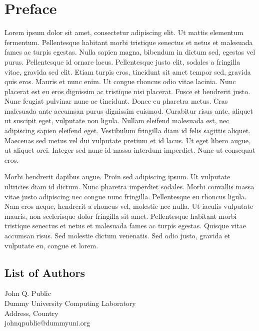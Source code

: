 \documentclass[a4paper,UKenglish]{oasicsmaster-v2016}
\begin{document}
\chapter{Preface} %

Lorem ipsum dolor sit amet, consectetur adipiscing elit. Ut mattis
elementum fermentum. Pellentesque habitant morbi tristique senectus et
netus et malesuada fames ac turpis egestas. Nulla sapien magna,
bibendum in dictum sed, egestas vel purus. Pellentesque id ornare
lacus. Pellentesque justo elit, sodales a fringilla vitae, gravida sed
elit. Etiam turpis eros, tincidunt sit amet tempor sed, gravida quis
eros. Mauris et nunc enim. Ut congue rhoncus odio vitae lacinia. Nunc
placerat est eu eros dignissim ac tristique nisi placerat. Fusce et
hendrerit justo. Nunc feugiat pulvinar nunc ac tincidunt. Donec eu
pharetra metus. Cras malesuada ante accumsan purus dignissim
euismod. Curabitur risus ante, aliquet ut suscipit eget, vulputate non
ligula. Nullam eleifend malesuada est, nec adipiscing sapien eleifend
eget. Vestibulum fringilla diam id felis sagittis aliquet. Maecenas
sed metus vel dui vulputate pretium et id lacus. Ut eget libero augue,
ut aliquet orci. Integer sed nunc id massa interdum imperdiet. Nunc ut
consequat eros.

Morbi hendrerit dapibus augue. Proin sed adipiscing ipsum. Ut
vulputate ultricies diam id dictum. Nunc pharetra imperdiet
sodales. Morbi convallis massa vitae justo adipiscing nec congue nunc
fringilla. Pellentesque eu rhoncus ligula. Nam eros neque, hendrerit a
rhoncus vel, molestie nec nulla. Ut iaculis vulputate mauris, non
scelerisque dolor fringilla sit amet. Pellentesque habitant morbi
tristique senectus et netus et malesuada fames ac turpis
egestas. Quisque vitae accumsan risus. Sed molestie dictum
venenatis. Sed odio justo, gravida et vulputate eu, congue et lorem. 


\begin{participants}
\chapter[Authors]{List of Authors}
\participant John Q. Public\\ 
  Dummy University Computing Laboratory\\
  Address, Country\\
  johnqpublic@dummyuni.org

\end{participants} 
\end{document}
